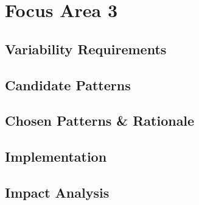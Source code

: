 \section{Focus Area 3}\label{sec:focus_area_3}

\subsection{Variability Requirements}\label{sec:variability_requirements_3}

\subsection{Candidate Patterns}\label{sec:candidate_patterns_3}

\subsection{Chosen Patterns \& Rationale}\label{sec:chosen_patterns_rationale_3}

\subsection{Implementation}\label{sec:implementation_3}

\subsection{Impact Analysis}\label{sec:impact_analysis_3}
